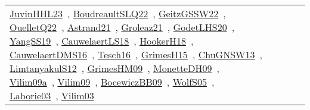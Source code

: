 {\begin{longtable}{lp{3cm}>{\raggedright\arraybackslash}p{6cm}>{\raggedright\arraybackslash}p{6cm}>{\raggedright\arraybackslash}p{8cm}}
\href{works/JuvinHHL23.pdf}{JuvinHHL23}~\cite{JuvinHHL23}, \href{works/BoudreaultSLQ22.pdf}{BoudreaultSLQ22}~\cite{BoudreaultSLQ22}, \href{works/GeitzGSSW22.pdf}{GeitzGSSW22}~\cite{GeitzGSSW22}, \href{works/OuelletQ22.pdf}{OuelletQ22}~\cite{OuelletQ22}, \href{works/Astrand21.pdf}{Astrand21}~\cite{Astrand21}, \href{works/Groleaz21.pdf}{Groleaz21}~\cite{Groleaz21}, \href{works/GodetLHS20.pdf}{GodetLHS20}~\cite{GodetLHS20}, \href{works/YangSS19.pdf}{YangSS19}~\cite{YangSS19}, \href{works/CauwelaertLS18.pdf}{CauwelaertLS18}~\cite{CauwelaertLS18}, \href{works/HookerH18.pdf}{HookerH18}~\cite{HookerH18}, \href{works/CauwelaertDMS16.pdf}{CauwelaertDMS16}~\cite{CauwelaertDMS16}, \href{works/Tesch16.pdf}{Tesch16}~\cite{Tesch16}, \href{works/GrimesH15.pdf}{GrimesH15}~\cite{GrimesH15}, \href{works/ChuGNSW13.pdf}{ChuGNSW13}~\cite{ChuGNSW13}, \href{works/LimtanyakulS12.pdf}{LimtanyakulS12}~\cite{LimtanyakulS12}, \href{works/GrimesHM09.pdf}{GrimesHM09}~\cite{GrimesHM09}, \href{works/MonetteDH09.pdf}{MonetteDH09}~\cite{MonetteDH09}, \href{works/Vilim09a.pdf}{Vilim09a}~\cite{Vilim09a}, \href{works/Vilim09.pdf}{Vilim09}~\cite{Vilim09}, \href{works/BocewiczBB09.pdf}{BocewiczBB09}~\cite{BocewiczBB09}, \href{works/WolfS05.pdf}{WolfS05}~\cite{WolfS05}, \href{works/Laborie03.pdf}{Laborie03}~\cite{Laborie03}, \href{works/Vilim03.pdf}{Vilim03}~\cite{Vilim03}\\

\end{longtable}}
